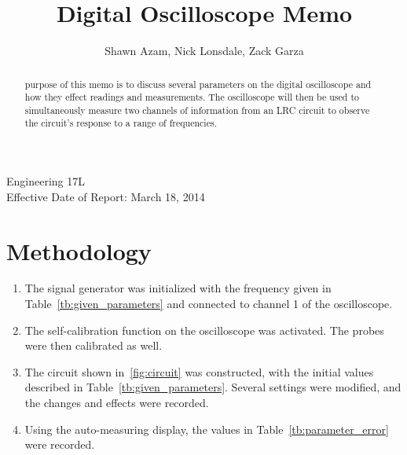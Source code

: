 \documentclass[twocolumn,english]{IEEEtran}
\theoremstyle{plain}
\theoremstyle{plain}
\begin{document}
\title{Digital Oscilloscope Memo}


\author{Shawn Azam, Nick Lonsdale, Zack Garza}


\IEEEspecialpapernotice
{Engineering 17L\\
Effective Date of Report: March 18, 2014}


\maketitle
\begin{abstract}
 purpose of this memo is to discuss several parameters on the digital oscilloscope and how they effect readings and measurements. The oscilloscope will then be used to simultaneously measure two channels of information from an LRC circuit to observe the circuit's response to a range of frequencies.
\end{abstract}

\tableofcontents

\section{Methodology}
\begin{enumerate}
 \item The signal generator was initialized with the frequency given in Table~\ref{tb:given_parameters} and connected to channel 1 of the oscilloscope.
 \item The self-calibration function on the oscilloscope was activated. The probes were then calibrated as well.
 \item The circuit shown in~\ref{fig:circuit} was constructed, with the initial values described in Table~\ref{tb:given_parameters}. Several settings were modified, and the changes and effects were recorded.
 \item Using the auto-measuring display, the values in Table~\ref{tb:parameter_error} were recorded.
\end{enumerate}
\end{document}
